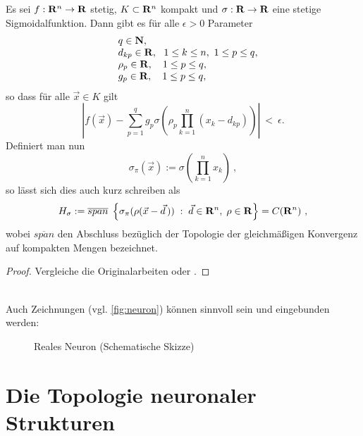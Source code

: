\begin{theorem}
Es sei $f: \mathbf{R}^n \to \mathbf{R}$ stetig, $K \subset \mathbf{R}^n$ kompakt
und $\sigma: \mathbf{R} \to \mathbf{R}$ eine stetige Sigmoidalfunktion.
Dann gibt es für alle $\epsilon > 0$ Parameter
\begin{equation}
\begin{array}{rl}
& q \in \mathbf{N}, \\
& d_{kp} \in \mathbf{R}, \ \ 1 \le k \le n , \ 1 \le p \le q , \\
& \rho_p \in \mathbf{R}, \ \ \ 1 \le p \le q , \\
& g_p \in \mathbf{R}, \ \ \ 1 \le p \le q , 
\end{array}\end{equation}
so dass für alle $\vec x \in K$ gilt
\begin{equation}
\left| f(\vec x ) - \sum_{p=1}^q g_p \sigma 
\left( \rho_p \prod\limits_{k=1}^n (x_k-d_{kp}) \right) \right| \ < \ \epsilon .
\end{equation}
Definiert man nun
\begin{equation}
\sigma_{\pi}(\vec x ) := \sigma(\prod_{k=1}^n x_k) \ ,
\end{equation}
so lässt sich dies auch kurz schreiben als
\begin{equation}
H_{\sigma}  :=	\overline{span} \; \left\{ \sigma_{\pi}(\rho ( \vec x - \vec d \, )) \; : \;
\vec d \in \mathbf{R}^n, \; \rho \in \mathbf{R} \right\}	=  C(\mathbf{R}^n ) \ ,
\end{equation}
wobei $\overline{span}$ den Abschluss bezüglich der Topologie der
gleichmäßigen Konvergenz auf kompakten Mengen bezeichnet.
\end{theorem}
\noindent
\begin{proof}
Vergleiche die Originalarbeiten \cite{Lenze_Note_1994,Pinkus_TDI_1996} oder \cite[][S.\ 163ff]{Lenze_Einfuehrung_2003}.
\end{proof}
\\
\noindent
Auch Zeichnungen (vgl. \autoref{fig:neuron}) können sinnvoll sein und
eingebunden werden: 

\begin{figure}[htb]
\caption[Reales Neuron]{\label{fig:neuron}Reales Neuron (Schematische Skizze)}
\end{figure}

\section{Die Topologie neuronaler Strukturen}

